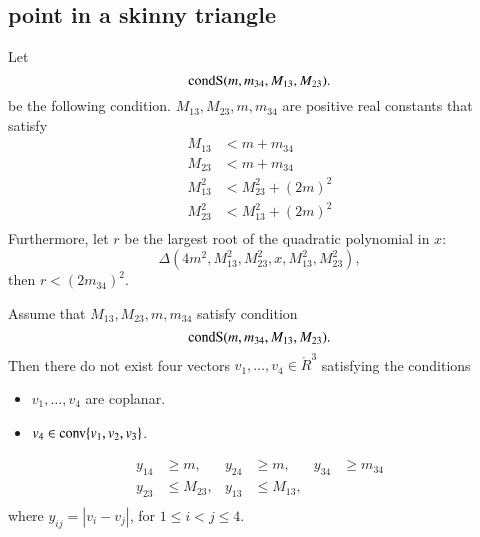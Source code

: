 \begin{tarskidata}
\begin{tarski}
\subsection{point in a skinny triangle}

\begin{definition}[condS]
Let 
	$$
	{\operatorname{condS}}(m,m_{34},M_{13},M_{23}). 
	$$
be the following condition.
 $M_{13},M_{23},m,m_{34}$ are positive real constants
that satisfy 
	$$
	\begin{array}{rll}
		M_{13} &< m + m_{34}\\
		M_{23} &< m + m_{34}\\
		M_{13}^2 &< M_{23}^2 + (2m)^2\\
		M_{23}^2 &< M_{13}^2 + (2m)^2\\
	\end{array}
	$$
Furthermore, let $r$ be the largest root of the quadratic polynomial in $x$:
	$$\Delta(4m^2,M_{13}^2,M_{23}^2,x,M_{13}^2,M_{23}^2),$$
then $r < (2 m_{34})^2$.
\end{definition}
\end{tarski}




\begin{tarski}

\begin{lemma}
Assume that $M_{13},M_{23},m,m_{34}$ satisfy condition
   $${\operatorname{condS}}(m,m_{34},M_{13},M_{23}).$$
Then there do not exist four vectors
$v_1,\ldots,v_4\in\ring{R}^3$ satisfying the conditions
	\begin{itemize}
		\item $v_1,\ldots,v_4$ are coplanar.
		\item $v_4\in{\operatorname{conv}}\{v_1,v_2,v_3\}$.
	\end{itemize}
	$$
	\begin{array}{rlrlrl}
		y_{14} &\ge m, &y_{24} &\ge m, &y_{34}&\ge m_{34}\\
		y_{23} &\le  M_{23}, &y_{13} & \le M_{13}, &\\
	\end{array}
	$$
where
$y_{ij}=|v_i-v_j|$,
for $1\le i < j \le 4$.  
\end{lemma}


\end{tarski}
\end{tarskidata}
